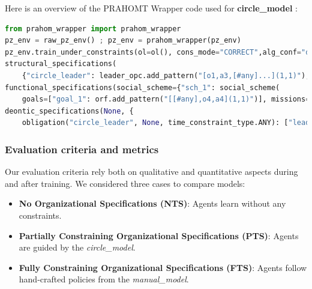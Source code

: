 \documentclass[runningheads]{llncs}
\theoremstyle{freethm}
\theoremstyle{proofoutline}
\begin{document}
\noindent Here is an overview of the PRAHOMT Wrapper code used for \textbf{circle\_model} :
%
\begin{lstlisting}[language=Python, basicstyle=\scriptsize]
from prahom_wrapper import prahom_wrapper
pz_env = raw_pz_env() ; pz_env = prahom_wrapper(pz_env)
pz_env.train_under_constraints(ol=ol(), cons_mode="CORRECT",alg_conf="default_MAPPO",osr=organizational_model(
structural_specifications(
    {"circle_leader": leader_opc.add_pattern("[o1,a3,[#any]...](1,1)"),"circle_follower": normal_opc.add_pattern("[o1,a2,[#any]...](1,1)")}, None,None),
functional_specifications(social_scheme={"sch_1": social_scheme(
    goals=["goal_1": orf.add_pattern("[[#any],o4,a4](1,1)")], missions=["prey_proximity"], goals_structure=None, mission_to_goals={"prey_proximity": ["goal_0"]}, mission_to_agent_cardinality={"prey_proximity": cardinality(1, "*")})}, social_preferences=None),
deontic_specifications(None, {
    obligation("circle_leader", None, time_constraint_type.ANY): ["leadadversary_0"], obligation("circle_follower", None, time_constraint_type.ANY): ["adversary_0", "adversary_1", "adversary_2"]})))
\end{lstlisting}

\subsubsection{Evaluation criteria and metrics}

Our evaluation criteria rely both on qualitative and quantitative aspects during and after training. We considered three cases to compare models:
\begin{itemize}
    \item \textbf{No Organizational Specifications (NTS)}: Agents learn without any constraints.
    \item \textbf{Partially Constraining Organizational Specifications (PTS)}: Agents are guided by the \textit{circle\_model}.
    \item \textbf{Fully Constraining Organizational Specifications (FTS)}: Agents follow hand-crafted policies from the \textit{manual\_model}.
\end{itemize}
\end{document}
